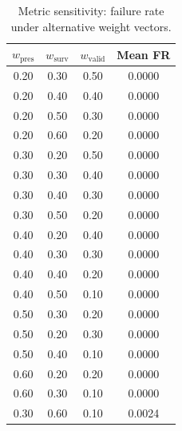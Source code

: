\begin{table}[t]
\centering
\caption{Metric sensitivity: failure rate under alternative weight vectors.}
\label{tab:metric_sensitivity}
\begin{tabular}{cccc}
\toprule
$w_{\mathrm{pres}}$ & $w_{\mathrm{surv}}$ & $w_{\mathrm{valid}}$ & Mean FR \\
\midrule
0.20 & 0.30 & 0.50 & 0.0000 \\
0.20 & 0.40 & 0.40 & 0.0000 \\
0.20 & 0.50 & 0.30 & 0.0000 \\
0.20 & 0.60 & 0.20 & 0.0000 \\
0.30 & 0.20 & 0.50 & 0.0000 \\
0.30 & 0.30 & 0.40 & 0.0000 \\
0.30 & 0.40 & 0.30 & 0.0000 \\
0.30 & 0.50 & 0.20 & 0.0000 \\
0.40 & 0.20 & 0.40 & 0.0000 \\
0.40 & 0.30 & 0.30 & 0.0000 \\
0.40 & 0.40 & 0.20 & 0.0000 \\
0.40 & 0.50 & 0.10 & 0.0000 \\
0.50 & 0.30 & 0.20 & 0.0000 \\
0.50 & 0.20 & 0.30 & 0.0000 \\
0.50 & 0.40 & 0.10 & 0.0000 \\
0.60 & 0.20 & 0.20 & 0.0000 \\
0.60 & 0.30 & 0.10 & 0.0000 \\
0.30 & 0.60 & 0.10 & 0.0024 \\
\bottomrule
\end{tabular}
\end{table}